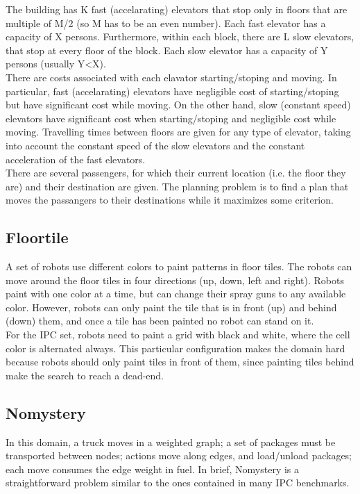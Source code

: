 The building has K fast (accelarating) elevators that stop only in floors that are multiple of M/2 (so M has to be an even number). Each fast elevator has a capacity of X persons. Furthermore, within each block, there are L slow elevators, that stop at every floor of the block. Each slow elevator has a capacity of Y persons (usually Y<X).\\

There are costs associated with each elavator starting/stoping and moving. In particular, fast (accelarating) elevators have negligible cost of starting/stoping but have significant cost while moving. On the other hand, slow (constant speed) elevators have significant cost when starting/stoping and negligible cost while moving. Travelling times between floors are given for any type of elevator, taking into account the constant speed of the slow elevators and the constant acceleration of the fast elevators.\\

There are several passengers, for which their current location (i.e. the floor they are) and their destination are given. The planning problem is to find a plan that moves the passangers to their destinations while it maximizes some criterion.

\subsection{Floortile}
A set of robots use different colors to paint patterns in floor tiles. The robots can move around the floor tiles in four directions (up, down, left and right). Robots paint with one color at a time, but can change their spray guns to any available color. However, robots can only paint the tile that is in front (up) and behind (down) them, and once a tile has been painted no robot can stand on it.\\

For the IPC set, robots need to paint a grid with black and white, where the cell color is alternated always. This particular configuration makes the domain hard because robots should only paint tiles in front of them, since painting tiles behind make the search to reach a dead-end.

\subsection{Nomystery}
In this domain, a truck moves in a weighted graph; a set of packages must be transported between nodes; actions move along edges, and load/unload packages; each move consumes the edge weight in fuel. In brief, Nomystery is a straightforward problem similar to the ones contained in many IPC benchmarks.

